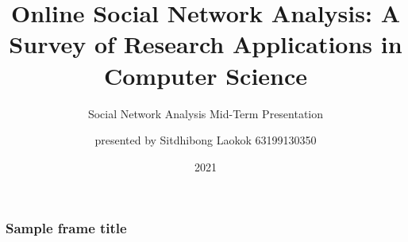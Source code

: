 \documentclass[10pt]{beamer}
\title{Online Social Network Analysis: A Survey of Research Applications in Computer Science}
\subtitle{Social Network Analysis Mid-Term Presentation}
\author{presented by {\newline}Sitdhibong Laokok {\newline}63199130350}
\date{2021}
\begin{document}
\frame{\titlepage}

\begin{frame}
\frametitle{Sample frame title}
\end{frame}
\end{document}

